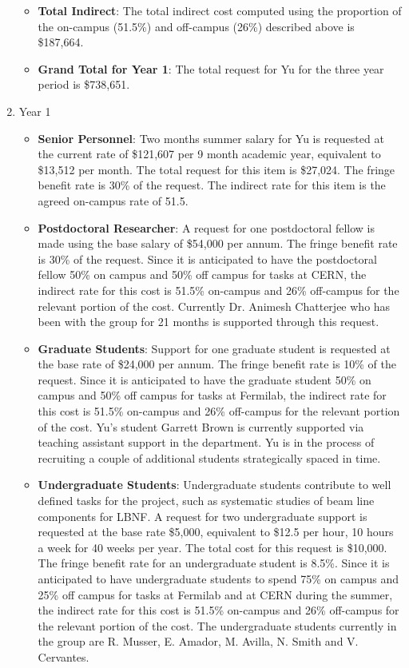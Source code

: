 \begin{enumerate}
\begin{itemize}[noitemsep,nolistsep]
\item {{\bf Total Indirect}: The total indirect cost computed using the proportion of the on-campus (51.5\%) and off-campus (26\%) described above is \$187,664.}

\item {{\bf Grand Total for Year 1}: The total request for Yu for the three year period is \$738,651.}

\end{itemize}

\item{Year 1}
\begin{itemize}[noitemsep,nolistsep]
\item{{\bf Senior Personnel}: Two months summer salary for Yu is requested at the current rate of \$121,607 per 9 month academic year, equivalent to \$13,512 per month.  The total request for this item is \$27,024. The fringe benefit rate is 30\% of the request.  The indirect rate for this item is the agreed on-campus rate of 51.5.}

\item {{\bf Postdoctoral Researcher}: A request for one postdoctoral fellow is made using the base salary of \$54,000 per annum.  The fringe benefit rate is 30\% of the request.  Since it is anticipated to have the postdoctoral fellow 50\% on campus and 50\% off campus for tasks at CERN, the indirect rate for this cost is 51.5\% on-campus and 26\% off-campus for the relevant portion of the cost.  Currently Dr. Animesh Chatterjee who has been with the group for 21 months is supported through this request.} 

\item{{\bf Graduate Students}: Support for one graduate student is requested at the base rate of \$24,000 per annum.   The fringe benefit rate is 10\% of the request.  Since it is anticipated to have the graduate student 50\% on campus and 50\% off campus for tasks at Fermilab, the indirect rate for this cost is 51.5\% on-campus and 26\% off-campus for the relevant portion of the cost.   Yu’s student Garrett Brown is currently supported via teaching assistant support in the department.   Yu is in the process of recruiting a couple of additional students strategically spaced in time. }

\item {{\bf Undergraduate Students}: Undergraduate students contribute to well defined tasks for the project, such as systematic studies of beam line components for LBNF.  A request for two undergraduate support is requested at the base rate \$5,000, equivalent to \$12.5 per hour, 10 hours a week for 40 weeks per year.  The total cost for this request is \$10,000.  The fringe benefit rate for an undergraduate student is 8.5\%.  Since it is anticipated to have undergraduate students to spend 75\% on campus and 25\% off campus for tasks at Fermilab and at CERN during the summer, the indirect rate for this cost is 51.5\% on-campus and 26\% off-campus for the relevant portion of the cost.   The undergraduate students currently in the group are R. Musser,  E. Amador, M. Avilla, N. Smith and V. Cervantes.}


\end{itemize}
\end{enumerate}
